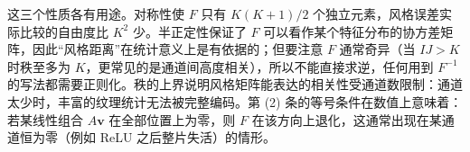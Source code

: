 \documentclass[../../main.tex]{subfiles}
\begin{document}
\begin{remark}
这三个性质各有用途。对称性使 $F$ 只有 $K(K+1)/2$ 个独立元素，风格误差实际比较的自由度比 $K^2$ 少。半正定性保证了 $F$ 可以看作某个特征分布的协方差矩阵，因此“风格距离”在统计意义上是有依据的；但要注意 $F$ 通常奇异（当 $IJ>K$ 时秩至多为 $K$，更常见的是通道间高度相关），所以不能直接求逆，任何用到 $F^{-1}$ 的写法都需要正则化。秩的上界说明风格矩阵能表达的相关性受通道数限制：通道太少时，丰富的纹理统计无法被完整编码。第 (2) 条的等号条件在数值上意味着：若某线性组合 $A\mathbf{v}$ 在全部位置上为零，则 $F$ 在该方向上退化，这通常出现在某通道恒为零（例如 ReLU 之后整片失活）的情形。
\end{remark}
\end{document}
